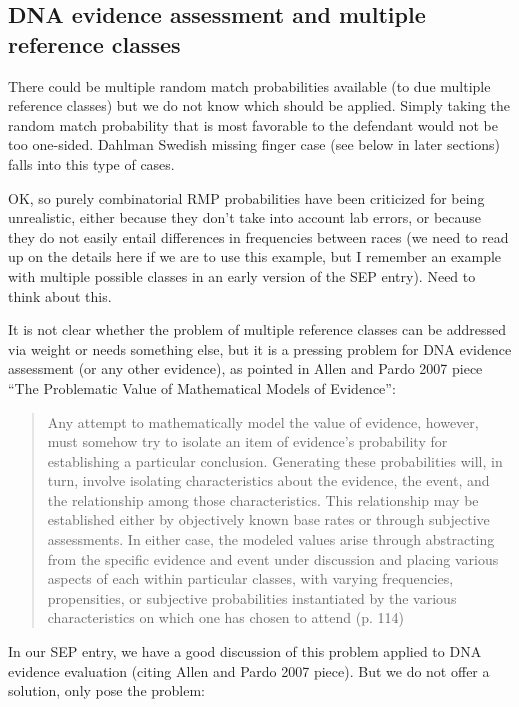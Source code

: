 \documentclass[
  10pt,
  dvipsnames,enabledeprecatedfontcommands]{scrartcl}
\begin{document}
\hypertarget{dna-evidence-assessment-and-multiple-reference-classes}{%
\subsection{DNA evidence assessment and multiple reference
classes}\label{dna-evidence-assessment-and-multiple-reference-classes}}

There could be multiple random match probabilities available (to due
multiple reference classes) but we do not know which should be applied.
Simply taking the random match probability that is most favorable to the
defendant would not be too one-sided. Dahlman Swedish missing finger
case (see below in later sections) falls into this type of cases.

\todo{} OK, so purely combinatorial RMP probabilities have been
criticized for being unrealistic, either because they don't take into
account lab errors, or because they do not easily entail differences in
frequencies between races (we need to read up on the details here if we
are to use this example, but I remember an example with multiple
possible classes in an early version of the SEP entry). Need to think
about this.

It is not clear whether the problem of multiple reference classes can be
addressed via weight or needs something else, but it is a pressing
problem for DNA evidence assessment (or any other evidence), as pointed
in Allen and Pardo 2007 piece ``The Problematic Value of Mathematical
Models of Evidence'':

\begin{quote}
Any attempt to mathematically model the value of evidence, however,
must somehow try to isolate an item of evidence’s probability for establishing a particular conclusion. Generating these probabilities will,
in turn, involve isolating characteristics about the evidence, the event,
and the relationship among those characteristics. This relationship may
be established either by objectively known base rates or through subjective assessments. In either case, the modeled values arise through
abstracting from the specific evidence and event under discussion and
placing various aspects of each within particular classes, with varying
frequencies, propensities, or subjective probabilities instantiated by the
various characteristics on which one has chosen to attend (p. 114)
\end{quote}

In our SEP entry, we have a good discussion of this problem applied to
DNA evidence evaluation (citing Allen and Pardo 2007 piece). But we do
not offer a solution, only pose the problem:
\end{document}
